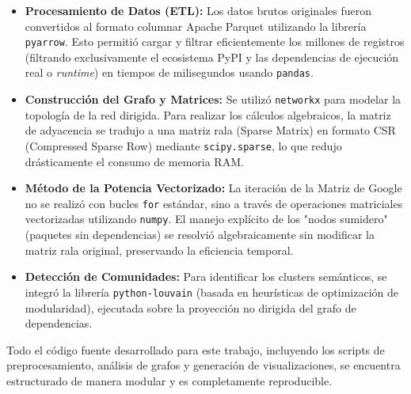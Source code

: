 \begin{itemize}
    \item \textbf{Procesamiento de Datos (ETL):} Los datos brutos originales fueron convertidos al formato columnar Apache Parquet utilizando la librería \texttt{pyarrow}. Esto permitió cargar y filtrar eficientemente los millones de registros (filtrando exclusivamente el ecosistema PyPI y las dependencias de ejecución real o \textit{runtime}) en tiempos de milisegundos usando \texttt{pandas}.
    \item \textbf{Construcción del Grafo y Matrices:} Se utilizó \texttt{networkx} para modelar la topología de la red dirigida. Para realizar los cálculos algebraicos, la matriz de adyacencia se tradujo a una matriz rala (Sparse Matrix) en formato CSR (Compressed Sparse Row) mediante \texttt{scipy.sparse}, lo que redujo drásticamente el consumo de memoria RAM.
    \item \textbf{Método de la Potencia Vectorizado:} La iteración de la Matriz de Google no se realizó con bucles \texttt{for} estándar, sino a través de operaciones matriciales vectorizadas utilizando \texttt{numpy}. El manejo explícito de los "nodos sumidero" (paquetes sin dependencias) se resolvió algebraicamente sin modificar la matriz rala original, preservando la eficiencia temporal.
    \item \textbf{Detección de Comunidades:} Para identificar los clusters semánticos, se integró la librería \texttt{python-louvain} (basada en heurísticas de optimización de modularidad), ejecutada sobre la proyección no dirigida del grafo de dependencias.
\end{itemize}

Todo el código fuente desarrollado para este trabajo, incluyendo los scripts de preprocesamiento, análisis de grafos y generación de visualizaciones, se encuentra estructurado de manera modular y es completamente reproducible.
